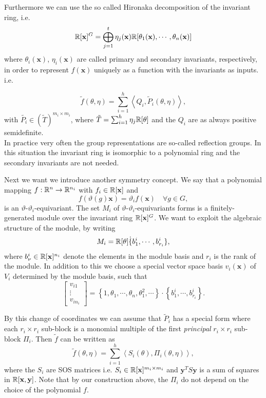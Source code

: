 \documentclass[]{article}
\begin{document}
Furthermore we can use the so called Hironaka decomposition of the invariant ring, i.e.
\[\mathbb R[\mathbf{x}]^G = \bigoplus_{j=1}^{t}\eta_j(\textbf{x})\mathbb R[\theta_1(\textbf{x}), \cdots, \theta_n(\mathbf{x})]\] 
where $\theta_i(\mathbf{x})$, $\eta_i(\mathbf{x})$ are called primary and secondary invariants, respectively, in order to represent $f(\mathbf{x})$ uniquely as a function with the invariants as inputs. i.e.

\[\tilde{f}(\theta,\eta) = \sum_{i=1}^{h}\left<Q_i,\tilde{P}_i(\theta,\eta)\right>,\] 
with $\tilde{P_i} \in (\tilde{T})^{m_i\times m_i}$, where $\tilde{T} = \sum_{i=1}^{h}\eta_j\mathbb R[\theta]$ and the $Q_i$ are as always positive semidefinite.\\

In practice very often the group representations are so-called reflection groups. In this situation the invariant ring is 
isomorphic to a polynomial ring and the secondary invariants are not needed. %

Next we want we introduce another symmetry concept. We say that a polynomial mapping $f:\mathbb R^n\rightarrow \mathbb R^{n_i}$ with $f_i\in\mathbb R[\mathbf{x}]$ and 
\[ f(\vartheta(g)\mathbf{x}) =\vartheta_i f(\mathbf{x})\quad \forall g\in G, \]
is an $\vartheta$-$\vartheta_i$-equivariant. The set $M_i$ of $\vartheta$-$\vartheta_i$-equivariants forms is a finitely-generated module over
the invariant ring $\mathbb R[\mathbf{x}]^G$. We want to exploit the algebraic structure of the module, by writing 
\[M_i = \mathbb R[\theta]\dot\{b_1^i,\cdots,b_{r_i}^i\},\]
where $b_{\nu}^i\in \mathbb R[\mathbf{x}]^{n_i}$ denote the elements in the module basis and $r_i$ is the rank of the module.  In addition to this we choose a special vector space basis $v_i(\mathbf{x})$ of $V_i$ determined by the module basis, such that
\[\begin{bmatrix}v_{i1}\\ \vdots \\ v_{in_i}\end{bmatrix}= \left\{1,\theta_1,\cdots, \theta_n,\theta_1^2,\cdots\right\}\cdot\left\{b_1^i,\cdots,b_{r_i}^i\right\}.\]


By this change of coordinates we can assume that $\tilde{P}_i$ has a special form where each $r_i\times r_i$ sub-block is a monomial multiple of the first \textit{principal} $r_i\times r_i$ sub-block $\Pi_i$. Then $\tilde{f}$ can be written as 
\[
    \tilde{f}(\theta, \eta)=\sum_{i=1}^h\left<S_i(\theta),\Pi_i(\theta,\eta)\right>,
\]
where the $S_i$ are SOS matrices i.e. $S_i\in \mathbb R[\mathbf{x}]^{m_i\times m_i}$ and $\mathbf{y}^TS\textbf{y}$ 
is a sum of squares in $\mathbb R[\textbf{x},\textbf{y}]$. Note that by our construction above, the $\Pi_i$ do not depend on the choice of the polynomial $f$.
\end{document}
